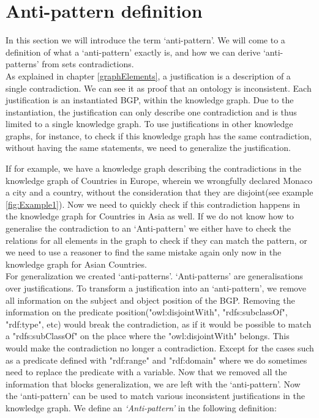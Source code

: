 \documentclass[11pt,letterpaper ,oneside ]{book}
\begin{document}
	\section{Anti-pattern definition}\label{AntiPatternDefinition}
	In this section we will introduce the term `anti-pattern'. We will come to a definition of what a `anti-pattern' exactly is, and how we can derive `anti-patterns' from sets contradictions. \\
	
	As explained in chapter \ref{graphElements}, a justification is a description of a single contradiction. We can see it as proof that an ontology is inconsistent. Each justification is an instantiated BGP, within the knowledge graph. Due to the instantiation, the justification can only describe one contradiction and is thus limited to a single knowledge graph. To use justifications in other knowledge graphs, for instance, to check if this knowledge graph has the same contradiction, without having the same statements, we need to generalize the justification.
	
	If for example, we have a knowledge graph describing the contradictions in the knowledge graph of Countries in Europe, wherein we wrongfully declared Monaco a city and a country, without the consideration that they are disjoint(see example \ref{fig:Example1}). Now we need to quickly check if this contradiction happens in the knowledge graph for Countries in Asia as well. If we do not know how to generalise the contradiction to an `Anti-pattern' we either have to check the relations for all elements in the graph to check if they can match the pattern, or we need to use a reasoner to find the same mistake again only now in the knowledge graph for Asian Countries.\\
	
	For generalization we created `anti-patterns'. `Anti-patterns' are generalisations over justifications. To transform a justification into an `anti-pattern', we remove all information on the subject and object position of the BGP. Removing the information on the predicate position("owl:disjointWith", "rdfs:subclassOf", "rdf:type", etc) would break the contradiction, as if it would be possible to match a "rdfs:subClassOf" on the place where the "owl:disjointWith" belongs. This would make the contradiction no longer a contradiction. Except for the cases such as a predicate defined with "rdf:range" and "rdf:domain" where we do sometimes need to replace the predicate with a variable. 
	Now that we removed all the information that blocks generalization, we are left with the `anti-pattern'. Now the `anti-pattern' can be used to match various inconsistent justifications in the knowledge graph. We define an \textit{`Anti-pattern'} in the following definition:\\
	
\end{document}
